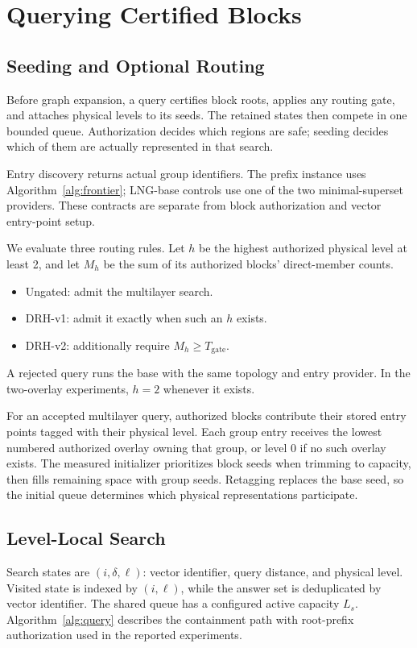 \section{Querying Certified Blocks}
\label{sec:query}
\subsection{Seeding and Optional Routing}
Before graph expansion, a query certifies block roots, applies any routing
gate, and attaches physical levels to its seeds. The retained states then
compete in one bounded queue. Authorization decides which regions are safe;
seeding decides which of them are actually represented in that search.

Entry discovery returns actual group identifiers.  The prefix instance uses
Algorithm~\ref{alg:frontier}; LNG-base controls use one of the two
minimal-superset providers.  These contracts are separate from block
authorization and vector entry-point setup.

We evaluate three routing rules. Let $h$ be the highest authorized
physical level at least 2, and let $M_h$ be the sum of its authorized
blocks' direct-member counts.
\begin{itemize}
\item Ungated: admit the multilayer search.
\item DRH-v1: admit it exactly when such an $h$ exists.
\item DRH-v2: additionally require $M_h\ge T_{\mathrm{gate}}$.
\end{itemize}
A rejected query runs the base with the same topology and entry provider.
In the two-overlay experiments, $h=2$ whenever it exists.

For an accepted multilayer query, authorized blocks contribute their stored
entry points tagged with their physical level.  Each group entry receives
the lowest numbered authorized overlay owning that group, or level 0
if no such overlay exists.  The measured initializer prioritizes block seeds when
trimming to capacity, then fills remaining space with group seeds.  Retagging replaces the base seed, so the initial queue determines
which physical representations participate.

\subsection{Level-Local Search}
Search states are $(i,\delta,\ell)$: vector identifier, query distance, and
physical level.  Visited state is indexed by $(i,\ell)$, while the answer
set is deduplicated by vector identifier.  The shared queue has a configured
active capacity $L_s$.  Algorithm~\ref{alg:query} describes the containment
path with root-prefix authorization used in the reported experiments.

